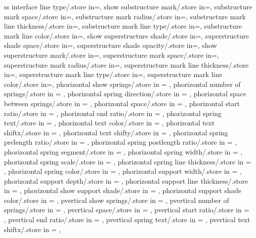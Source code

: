 {  ss interface line type/.store in=\ssinterlinetype,
  show substructure mark/.store in=\showmarkss,
  substructure mark space/.store in=\markssexspace,
  substructure mark radius/.store in=\markssrad,
  substructure mark line thickness/.store in=\marksslinet,
  substructure mark line type/.store in=\marksslinetype,
  substructure mark line color/.store in=\marksslinecolor,
  show superstructure shade/.store in=\showsupershade,
  superstructure shade space/.store in=\supershadespace,
  superstructure shade opacity/.store in=\supershadeopacity,
  show superstructure mark/.store in=\showmarksuper,
  superstructure mark space/.store in=\marksuperexspace,
  superstructure mark radius/.store in=\marksuperrad,
  superstructure mark line thickness/.store in=\marksuperlinet,
  superstructure mark line type/.store in=\marksuperlinetype,
  superstructure mark line color/.store in=\marksuperlinecolor,
  phorizontal show springs/.store in = \showphorizontalsprings,
  phorizontal number of springs/.store in = \phorspringnumber,
  phorizontal spring direction/.store in = \phorspringdir,
  phorizontal space between springs/.store in = \phorspbtwspr,
  phorizontal space/.store in = \phorspringspace,
  phorizontal start ratio/.store in = \phorspringstartratio,
  phorizontal end ratio/.store in = \phorspringendratio,
  phorizontal spring text/.store in = \phorspringtext,
  phorizontal text color/.store in = \phortextcolor,
  phorizontal text shiftx/.store in = \phortextshiftx,
  phorizontal text shifty/.store in = \phortextshifty,
  phorizontal spring prelength ratio/.store in = \phorprelenratio,
  phorizontal spring postlength ratio/.store in = \phorpostlenratio,
  phorizontal spring segment/.store in = \phorsegm,
  phorizontal spring width/.store in = \phorsprwid,
  phorizontal spring scale/.store in = \phorsprscale,
  phorizontal spring line thickness/.store in = \phorsprlinethk,
  phorizontal spring color/.store in = \phorsprcolor,
  phorizontal support width/.store in = \phorsuppwidth,
  phorizontal support depth/.store in = \phorsuppdepth,
  phorizontal support line thickness/.store in = \phorsupplinethk,
  phorizontal show support shade/.store in = \phorshowsuppshade,
  phorizontal support shade color/.store in = \phorsuppshadecol,
  pvertical show springs/.store in = \showpverticalsprings,
  pvertical number of springs/.store in = \pverspringnumber,
  pvertical space/.store in = \pverspringspace,
  pvertical start ratio/.store in = \pverspringstartratio,
  pvertical end ratio/.store in = \pverspringendratio,
  pvertical spring text/.store in = \pverspringtext,
  pvertical text shiftx/.store in = \pvertextshiftx,
}
